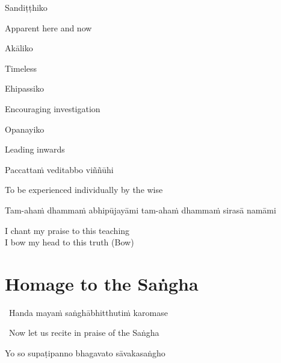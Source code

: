 Sandiṭṭhiko

\begin{english}
  Apparent here and now
\end{english}

Akāliko

\begin{english}
  Timeless
\end{english}

Ehipassiko

\begin{english}
  Encouraging investigation
\end{english}

Opanayiko

\begin{english}
  Leading inwards
\end{english}

Paccattaṁ veditabbo viññūhi

\begin{english}
  To be experienced individually by the wise
\end{english}

\begin{pali-hang}
  Tam-ahaṁ dhammaṁ abhipūjayāmi tam-ahaṁ dhammaṁ sirasā namāmi
\end{pali-hang}

\begin{english}
  I chant my praise to this teaching\\
  I bow my head to this truth \hfill{(Bow)}
\end{english}

\section{Homage to the Saṅgha}
\label{homage-sangha}

\begin{leader}
  \anglebracketleft\ \hspace{-0.5mm}Handa mayaṁ saṅghābhitthutiṁ karomase \hspace{-0.5mm}\anglebracketright\
\end{leader}
\begin{leader-english-belowpali}
  \anglebracketleft\ \hspace{-0.5mm}Now let us recite in praise of the Saṅgha \hspace{-0.5mm}\anglebracketright\
\end{leader-english-belowpali}

Yo so supaṭipanno bhagavato sāvakasaṅgho

